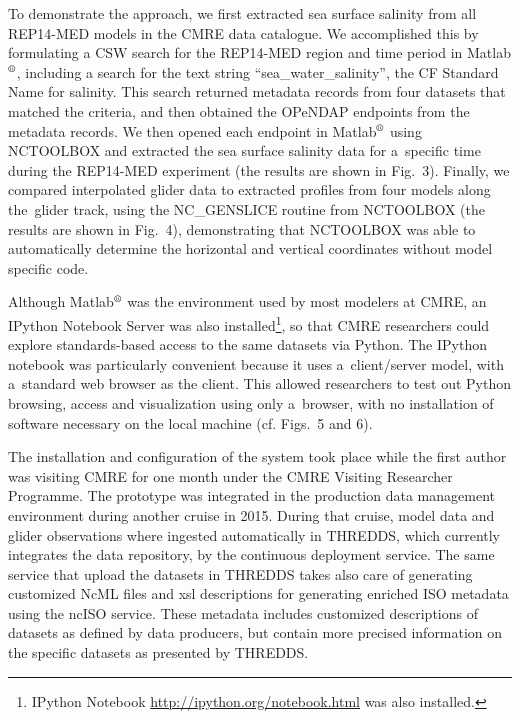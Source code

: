 \documentclass[osd, online, hvmath]{copernicus}
\begin{document}
To demonstrate the approach, we first extracted sea surface salinity from all REP14-MED models in the CMRE data catalogue. We accomplished this by 
formulating a  CSW search for the REP14-MED region and time period in Matlab$^{\text{\textregistered}}$, including a search for the text
string ``sea\_water\_salinity'', the CF Standard Name for salinity. This search returned metadata records from four datasets that matched the criteria, and then obtained the OPeNDAP endpoints from the metadata records. 
We then opened each endpoint in Matlab$^{\text{\textregistered}}$ using NCTOOLBOX and extracted the sea surface salinity data for a~specific time during the REP14-MED
experiment (the results are shown in Fig.~3). Finally, we compared interpolated glider data to extracted profiles from four models along the~glider track, using
the NC\_GENSLICE routine from NCTOOLBOX (the results are shown in Fig.~4), demonstrating that NCTOOLBOX was able to automatically
determine the horizontal and vertical coordinates without model specific code.

Although Matlab$^{\text{\textregistered}}$ was the environment used by
most modelers at CMRE, an IPython Notebook Server was also installed\footnote{IPython
  Notebook \url{http://ipython.org/notebook.html} was also
  installed.}, so that CMRE researchers could explore standards-based
access to the same datasets via Python. The IPython notebook was
particularly convenient because it uses a~client/server model, with
a~standard web browser as the client. This allowed researchers to test
out Python browsing, access and visualization using only a~browser,
with no installation of software necessary on the local machine
(cf. Figs.~5 and 6). %

The installation and configuration of the system took place while the first author was visiting CMRE for one month under the CMRE Visiting
Researcher Programme. The prototype was integrated in the production data management environment during another cruise in 2015. During that cruise, model data and glider observations where ingested automatically in THREDDS, which currently integrates the data repository, by the continuous deployment service. The same service that upload the datasets in THREDDS takes also care of generating customized NcML files and xsl descriptions for generating enriched ISO metadata using the ncISO service. These metadata includes customized descriptions of datasets as defined by data producers, but contain more precised information on the specific datasets as presented by THREDDS. 
\end{document}
